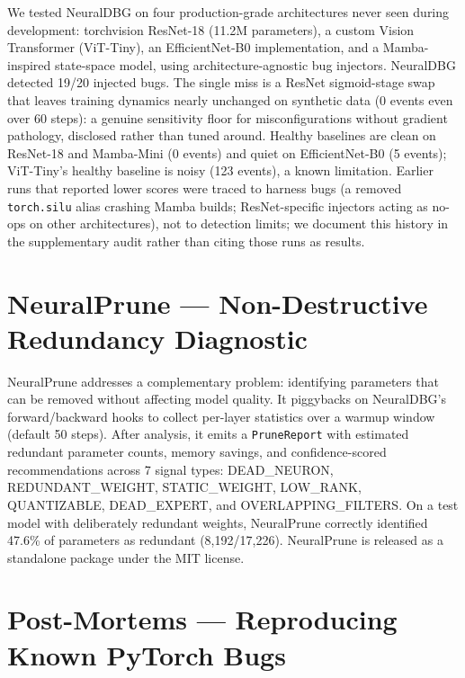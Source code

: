 \documentclass[11pt]{article}
\begin{document}
We tested NeuralDBG on four production-grade architectures never seen during development: torchvision ResNet-18 (11.2M parameters), a custom Vision Transformer (ViT-Tiny), an EfficientNet-B0 implementation, and a Mamba-inspired state-space model, using architecture-agnostic bug injectors. NeuralDBG detected 19/20 injected bugs. The single miss is a ResNet sigmoid-stage swap that leaves training dynamics nearly unchanged on synthetic data (0 events even over 60 steps): a genuine sensitivity floor for misconfigurations without gradient pathology, disclosed rather than tuned around. Healthy baselines are clean on ResNet-18 and Mamba-Mini (0 events) and quiet on EfficientNet-B0 (5 events); ViT-Tiny's healthy baseline is noisy (123 events), a known limitation. Earlier runs that reported lower scores were traced to harness bugs (a removed \texttt{torch.silu} alias crashing Mamba builds; ResNet-specific injectors acting as no-ops on other architectures), not to detection limits; we document this history in the supplementary audit rather than citing those runs as results.

\section{NeuralPrune --- Non-Destructive Redundancy Diagnostic}

NeuralPrune addresses a complementary problem: identifying parameters that can be removed without affecting model quality. It piggybacks on NeuralDBG's forward/backward hooks to collect per-layer statistics over a warmup window (default 50 steps). After analysis, it emits a \texttt{PruneReport} with estimated redundant parameter counts, memory savings, and confidence-scored recommendations across 7 signal types: DEAD\_NEURON, REDUNDANT\_WEIGHT, STATIC\_WEIGHT, LOW\_RANK, QUANTIZABLE, DEAD\_EXPERT, and OVERLAPPING\_FILTERS. On a test model with deliberately redundant weights, NeuralPrune correctly identified 47.6\% of parameters as redundant (8,192/17,226). NeuralPrune is released as a standalone package under the MIT license.

\section{Post-Mortems --- Reproducing Known PyTorch Bugs}
\end{document}

